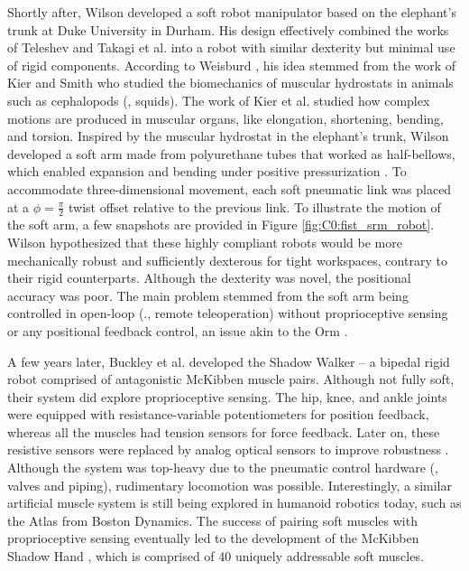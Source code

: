 \par Shortly after, Wilson \cite{Wilson2007} developed a soft robot manipulator based on the elephant's trunk at Duke University in Durham. His design effectively combined the works of Teleshev \cite{Teleshev1981} and Takagi et al. \cite{Takagi1983} into a robot with similar dexterity but minimal use of rigid components. According to Weisburd \cite{Weisburd1988}, his idea stemmed from the work of Kier and Smith \cite{Kier1985} who studied the biomechanics of muscular hydrostats in animals such as cephalopods (\eg, squids). The work of Kier et al. \cite{Kier1985} studied how complex motions are produced in muscular organs, like elongation, shortening, bending, and torsion. Inspired by the muscular hydrostat in the elephant's trunk, Wilson developed a soft arm made from polyurethane tubes that worked as half-bellows, which enabled expansion and bending under positive pressurization \cite{Weisburd1988}. To accommodate three-dimensional movement, each soft pneumatic link was placed at a $\phi = \frac{\pi}{2}$ twist offset relative to the previous link. To illustrate the motion of the soft arm, a few snapshots are provided in Figure \ref{fig:C0:fist_srm_robot}. Wilson hypothesized that these highly compliant robots would be more mechanically robust and sufficiently dexterous for tight workspaces, contrary to their rigid counterparts. Although the dexterity was novel, the positional accuracy was poor. The main problem stemmed from the soft arm being controlled in open-loop (\ie., remote teleoperation) without proprioceptive sensing or any positional feedback control, an issue akin to the Orm \cite{Corke2020}.

A few years later, Buckley et al. \cite{Buckley2012} developed the Shadow Walker -- a bipedal rigid robot comprised of antagonistic McKibben muscle pairs. Although not fully soft, their system did explore proprioceptive sensing. The hip, knee, and ankle joints were equipped with resistance-variable potentiometers for position feedback, whereas all the muscles had tension sensors for force feedback. Later on, these resistive sensors were replaced by analog optical sensors to improve robustness \cite{Buckley2012}. Although the system was top-heavy due to the pneumatic control hardware (\eg, valves and piping), rudimentary locomotion was possible. Interestingly, a similar artificial muscle system is still being explored in humanoid robotics today, such as the Atlas from Boston Dynamics. The success of pairing soft muscles with proprioceptive sensing eventually led to the development of the McKibben Shadow Hand \cite{Buckley2012, Gong2022Feb}, which is comprised of 40 uniquely addressable soft muscles.

